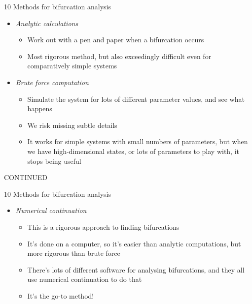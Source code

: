 \documentclass[presentation]{beamer}
\begin{document}
\begin{frame}[label={sec:org09f77bc}]{10 Methods for bifurcation analysis}
\begin{itemize}
\item \emph{Analytic calculations}
\begin{itemize}
\item Work out with a pen and paper when a bifurcation occurs
\item Most rigorous method, but also exceedingly difficult even for comparatively simple systems
\end{itemize}
\item \emph{Brute force computation}
\begin{itemize}
\item Simulate the system for lots of different parameter values, and see what happens
\item We risk missing subtle details
\item It works for simple systems with small numbers of parameters, but when we have high-dimensional states, or lots of parameters to play with, it stops being useful

\vfill
\end{itemize}
\end{itemize}
CONTINUED 
\end{frame}

\begin{frame}[label={sec:org544f7d5}]{10 Methods for bifurcation analysis}
\begin{itemize}
\item \emph{Numerical continuation}
\begin{itemize}
\item This is a rigorous approach to finding bifurcations
\item It's done on a computer, so it's easier than analytic computations, but more rigorous than brute force
\item There's lots of different software for analysing bifurcations, and they all use numerical continuation to do that
\item It's the go-to method!
\end{itemize}
\end{itemize}
\end{frame}
\end{document}
